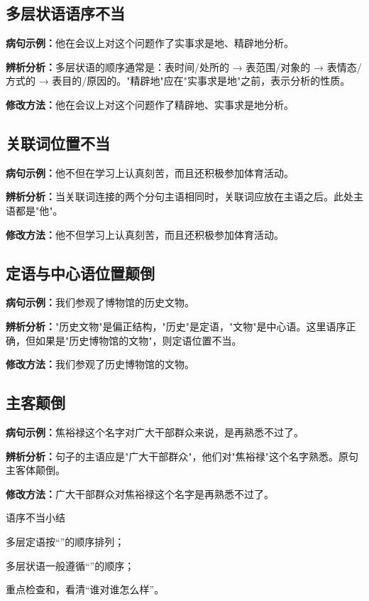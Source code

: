 \documentclass[a4paper,12pt]{ctexrep}
\newcommand{\exampleicon}{\textcolor{highlight}{\faExclamationTriangle}}
\newcommand{\analysisicon}{\textcolor{accent}{\faSearch}}
\newcommand{\revisionicon}{\textcolor{secondary}{\faCheckCircle}}
\begin{document}
\subsection{多层状语语序不当}
\exampleicon \textbf{病句示例：}他在会议上对这个问题作了实事求是地、精辟地分析。

\analysisicon \textbf{辨析分析：}多层状语的顺序通常是：表时间/处所的 → 表范围/对象的 → 表情态/方式的 → 表目的/原因的。"精辟地"应在"实事求是地"之前，表示分析的性质。

\revisionicon \textbf{修改方法：}他在会议上对这个问题作了精辟地、实事求是地分析。

\subsection{关联词位置不当}
\exampleicon \textbf{病句示例：}他不但在学习上认真刻苦，而且还积极参加体育活动。

\analysisicon \textbf{辨析分析：}当关联词连接的两个分句主语相同时，关联词应放在主语之后。此处主语都是"他"。

\revisionicon \textbf{修改方法：}他不但学习上认真刻苦，而且还积极参加体育活动。

\subsection{定语与中心语位置颠倒}
\exampleicon \textbf{病句示例：}我们参观了博物馆的历史文物。

\analysisicon \textbf{辨析分析：}"历史文物"是偏正结构，"历史"是定语，"文物"是中心语。这里语序正确，但如果是"历史博物馆的文物"，则定语位置不当。

\revisionicon \textbf{修改方法：}我们参观了历史博物馆的文物。

\subsection{主客颠倒}
\exampleicon \textbf{病句示例：}焦裕禄这个名字对广大干部群众来说，是再熟悉不过了。

\analysisicon \textbf{辨析分析：}句子的主语应是"广大干部群众"，他们对"焦裕禄"这个名字熟悉。原句主客体颠倒。

\revisionicon \textbf{修改方法：}广大干部群众对焦裕禄这个名字是再熟悉不过了。

\begin{summarybox}{语序不当小结}
\begin{focuspoints}
  \item 多层定语按“”的顺序排列；
  \item 多层状语一般遵循“”的顺序；
  \item 重点检查和，看清“谁对谁怎么样”。
\end{focuspoints}
\end{summarybox}
\end{document}

